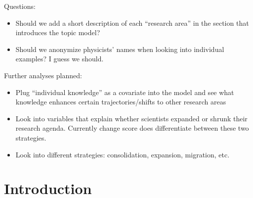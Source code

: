 \documentclass{article}
\begin{document}
Questions:

\begin{itemize}
    \item Should we add a short description of each ``research area'' in the section that introduces the topic model?
    \item Should we anonymize physicists' names when looking into individual examples? I guess we should.
\end{itemize}

Further analyses planned:
\begin{itemize}
    \item Plug ``individual knowledge'' as a covariate into the model and see what knowledge enhances certain trajectories/shifts to other research areas
    \item Look into variables that explain whether scientists expanded or shrunk their research agenda. Currently change score does differentiate between these two strategies.
    \item Look into different strategies: consolidation, expansion, migration, etc.
\end{itemize}

\section{Introduction}
\end{document}
